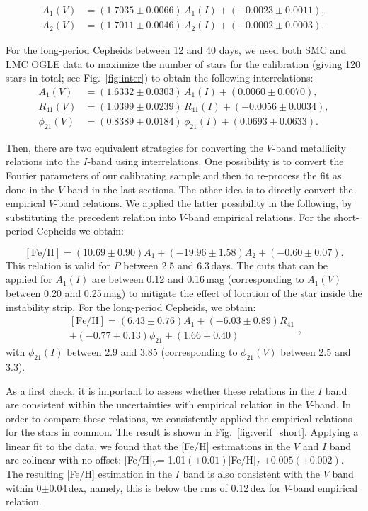 \documentclass[article]{aa} %
\begin{document}
\begin{align}
A_1(V)&=(1.7035\pm0.0066)\,A_1(I) + (-0.0023\pm0.0011), \label{eq:A1}\\
A_2(V)&=(1.7011\pm0.0046)\,A_2(I) + (-0.0002\pm0.0003).
\end{align}

For the long-period Cepheids between 12 and 40 days, we used both SMC and LMC OGLE data to maximize the number of stars for the calibration (giving 120 stars in total; see Fig.~\ref{fig:inter}) to obtain the following interrelations:
\begin{align}
A_1(V)&=(1.6332\pm0.0303)\,A_1(I) + (0.0060\pm0.0070),\\
R_{41}(V)&=(1.0399\pm0.0239)\,R_{41}(I) + (-0.0056\pm0.0034),\\
\phi_{21}(V)&=(0.8389\pm0.0184)\,\phi_{21}(I) + (0.0693\pm0.0633).
\end{align}


Then, there are two equivalent strategies for converting the $V$-band metallicity relations into the $I$-band using interrelations. One possibility is to convert the Fourier parameters of our calibrating sample and then to re-process the fit as done in the $V$-band in the last sections.
The other idea is to directly convert the empirical $V$-band relations. We applied the latter possibility in the following, by substituting the precedent relation into $V$-band empirical relations.
For the short-period Cepheids we obtain:


\begin{equation}
    \mathrm{[Fe/H]}=(10.69\pm0.90)A_1 + (-19.96\pm1.58)A_2 + (-0.60\pm0.07).
\end{equation}
This relation is valid for $P$ between 2.5 and 6.3$\,$days. The cuts that can be applied for $A_{1}(I)$ are between 0.12 and 0.16$\,$mag (corresponding to $A_1(V)$ between 0.20 and 0.25$\,$mag) to mitigate the effect of location of the star inside the instability strip.
For the long-period Cepheids, we obtain:
\begin{equation}
\begin{split}
[\mathrm{Fe/H}]=(6.43\pm0.76)A_1+(-6.03\pm0.89)R_{41}\\
    +(-0.77\pm0.13)\phi_{21} + (1.66\pm0.40)
\end{split}
,\end{equation}
with $\phi_{21}(I)$ between 2.9 and 3.85 (corresponding to $\phi_{21}(V)$ between 2.5 and 3.3).

As a first check, it is important to assess whether these relations in the $I$ band are consistent within the uncertainties with empirical relation in the $V$-band. In order to compare these relations, we consistently applied the empirical relations for the stars in common. The result is shown in Fig.~\ref{fig:verif_short}. Applying a linear fit to the data, we found that the [Fe/H] estimations in the $V$ and $I$ band are colinear with no offset: [Fe/H]$_V$= 1.01$(\pm0.01)$[Fe/H]$_I$ $+0.005(\pm0.002)$. The resulting [Fe/H] estimation in the $I$ band is also consistent with the $V$ band within 0$\pm$0.04$\,$dex, namely, this is below the rms of 0.12$\,$dex for $V$-band empirical relation.
\end{document}
